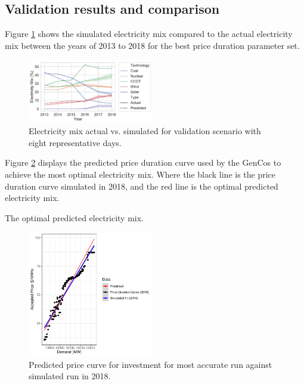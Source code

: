 \documentclass[final,3p,times,twocolumn,numbers]{elsarticle}
\begin{document}
\subsection{Validation results and comparison}


Figure \ref{fig:actual_vs_simulated_validation} shows the simulated electricity mix compared to the actual electricity mix between the years of 2013 to 2018 for the best price duration parameter set.


\begin{figure}
\centering
\includegraphics[width=0.49\textwidth]{figures/results/throughout_years.pdf}
\caption{Electricity mix actual vs. simulated for validation scenario with eight representative days.}
\label{fig:actual_vs_simulated_validation}
\end{figure}


Figure \ref{fig:best_price_curve} displays the predicted price duration curve used by the GenCos to achieve the most optimal electricity mix. Where the black line is the price duration curve simulated in 2018, and the red line is the optimal predicted electricity mix. 

The optimal predicted electricity mix.

\begin{figure}
\centering
\includegraphics[width=0.49\textwidth]{figures/results/best_run_price_dur_curve.pdf}
\caption{Predicted price curve for investment for most accurate run against simulated run in 2018.}
\label{fig:best_price_curve}
\end{figure}
\end{document}
